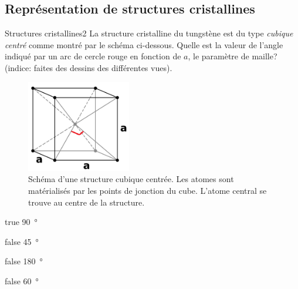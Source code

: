 \documentclass[11pt]{article}
\begin{document}
    \subsection{Représentation de structures cristallines}
        \begin{question}{31}{Structures cristallines}{2}{}
            La structure cristalline du tungstène est du type \emph{cubique centré} comme montré par le schéma ci-dessous. Quelle est la valeur de l'angle indiqué par un arc de cercle rouge en fonction de $a$, le paramètre de maille? (indice: faites des dessins des différentes vues).
            \begin{figure}
                \centering
                \includegraphics[height = 4cm]{Antoine/Figures_Antoine/BCC2.png}
                \caption{Schéma d'une structure cubique centrée. Les atomes sont matérialisés par les points de jonction du cube. L'atome central se trouve au centre de la structure.}
            \end{figure}
        \end{question}
        \begin{reponses} 
            \item[true] \SI{90}{\degree}
            \item[false] \SI{45}{\degree} 
            \item[false] \SI{180}{\degree}
    	    \item[false] \SI{60}{\degree}
        \end{reponses}
        
\end{document}
